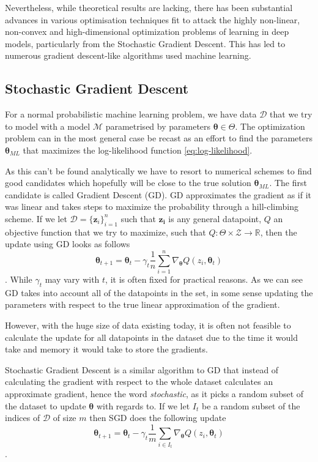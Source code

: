 Nevertheless, while theoretical results are lacking, there has been substantial
advances in various optimisation techniques fit to attack the highly non-linear,
non-convex and high-dimensional optimization problems of learning in deep
models, particularly from the Stochastic Gradient Descent. This has led to
numerous gradient descent-like algorithms used machine learning\cite{Ruder17}.

\subsection{Stochastic Gradient Descent}

For a normal probabilistic machine learning problem, we have data $\mathcal{D}$
that we try to model with a model $\mathcal{M}$ parametrised by parameters
$\bm{\theta} \in \Theta$. The optimization problem can in the most general case be recast
as an effort to find the parameters $\bm{\theta}_{ML}$ that maximizes the
log-likelihood function \ref{eq:log-likelihood}.

As this can't be found analytically we have to resort to numerical schemes to
find good candidates which hopefully will be close to the true solution
$\bm{\theta}_{ML}$. The first candidate is called Gradient Descent (GD).
GD approximates the gradient as if it was linear and takes steps to maximize the
probability through a hill-climbing scheme. If we let $\mathcal{D} =
\{\bm{z}_i\}_{i = 1}^n$ such that $\bm{z_i}$ is any general datapoint, $Q$ an
objective function that we try to maximize, such that $Q : \Theta \times
\mathcal{Z} \to \mathbb{R}$, then the update using GD looks as follows
\begin{equation}
  \label{eq:GD_update}
  \bm{\theta}_{t + 1} = \bm{\theta}_t - \gamma_t \frac{1}{n} \sum_{i = 1}^n \nabla_{\bm{\theta}} Q(z_i, \bm{\theta}_t)
\end{equation}.
While $\gamma_t$ may vary with $t$, it is often fixed for practical reasons. As
we can see GD takes into account all of the datapoints in the set, in some sense
updating the parameters with respect to the true linear approximation of the gradient.

However, with the huge size of data existing today, it is often not feasible to
calculate the update for all datapoints in the dataset due to the time it would
take and memory it would take to store the gradients.

Stochastic Gradient Descent is a similar algorithm to GD that instead of
calculating the gradient with respect to the whole dataset calculates an
approximate gradient, hence the word \textit{stochastic}, as it picks a random
subset of the dataset to update $\bm{\theta}$ with regards to. If we let $I_t$
be a random subset of the indices of $\mathcal{D}$ of size $m$ then SGD does the
following update
\begin{equation}
  \label{eq:SGD_update}
  \bm{\theta}_{t + 1} = \bm{\theta}_t - \gamma_t \frac{1}{m} \sum_{i \in I_t} \nabla_{\bm{\theta}} Q(z_i, \bm{\theta}_t)
\end{equation}\cite{series/lncs/Bottou12}\cite[p.~240]{Bishop:2006}.

